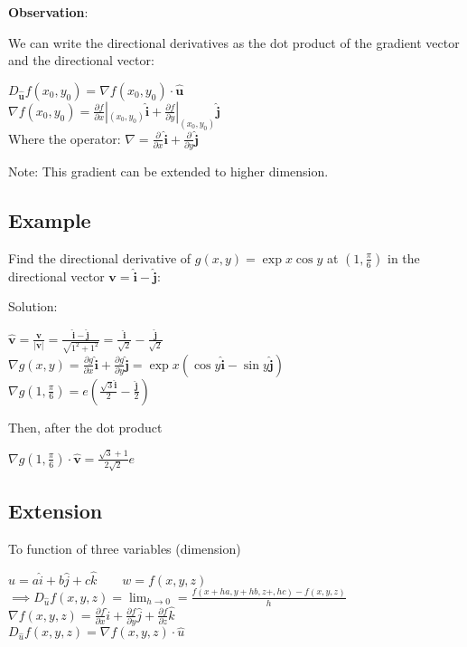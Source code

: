 \documentclass[UTF8,a4paper, 10pt, openany]{svmono}
\begin{document}
\textbf{Observation}:

We can write the directional derivatives as the dot product of the gradient vector and the directional vector:

\begin{center}
$D_{\mathbf{\hat{u}}}f(x_0,y_0)=\nabla f(x_0,y_0)\cdot \mathbf{\hat{u}}$\\
$\nabla f(x_0,y_0)=\frac{\partial f}{\partial x}|_{(x_0,y_0)}\mathbf{\hat{i}}+\frac{\partial f}{\partial y}|_{(x_0,y_0)}\mathbf{\hat{j}}$\\
Where the operator: $\nabla = \frac{\partial }{\partial x}\mathbf{\hat{i}}+\frac{\partial }{\partial y}\mathbf{\hat{j}}$
\end{center}

Note: This gradient can be extended to higher dimension.
\subsection{Example}
Find the directional derivative of $g(x,y)=\exp{x}\cos y$ at $(1,\frac{\pi}{6})$ in the directional vector $\mathbf{v}=\mathbf{\hat{i}}-\mathbf{\hat{j}}$:

Solution:
\begin{center}
$\mathbf{\hat{v}}=\frac{\mathbf{v}}{|\mathbf{v}|}=\frac{\mathbf{\hat{i}}-\mathbf{\hat{j}}}{\sqrt{1^2+1^2}}=\frac{\mathbf{\hat{i}}}{\sqrt{2}}-\frac{\mathbf{\hat{j}}}{\sqrt{2}}$\\
$\nabla g(x,y)=\frac{\partial g}{\partial x}\mathbf{\hat{i}}+\frac{\partial g}{\partial y}\mathbf{\hat{j}}=\exp{x}(\cos y\mathbf{\hat{i}}-\sin y\mathbf{\hat{j}})$\\
$\nabla g(1,\frac{\pi}{6})=e (\frac{\sqrt{3}\mathbf{\hat{i}}}{2}-\frac{\mathbf{\hat{j}}}{2})$
\end{center}

Then, after the dot product

\begin{center}
$\nabla g(1,\frac{\pi}{6})\cdot \mathbf{\hat{v}}=\frac{\sqrt{3}+1}{2\sqrt{2}}e$
\end{center}

\subsection{Extension}
To function of three variables (dimension)

\begin{center}
$\hat{u}=a\hat{i}+b\hat{j}+c\hat{k} \qquad w=f(x,y,z)$\\
$\implies D_{\hat{u}}f(x,y,z)=\displaystyle\lim_{h\rightarrow 0}=\frac{f(x+ha,y+hb,z+,hc)-f(x,y,z)}{h}$\\
$\nabla f(x,y,z)=\frac{\partial f}{\partial x}\hat{i}+\frac{\partial f}{\partial y}\hat{j}+\frac{\partial f}{\partial z}\hat{k}$\\
$\boxed{D_{\hat{u}}f(x,y,z)=\nabla f(x,y,z)\cdot \hat{u}}$
\end{center}
\end{document}
